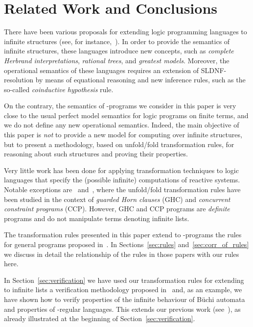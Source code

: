 \documentclass[english]{tlp}
\begin{document}
\section{Related Work and Conclusions}
\label{sec:related}

There have been various proposals for extending logic programming languages to
infinite structures (see, for instance,~\cite{Col82,Llo87,MiG09,Si&06}). 
In order to provide the semantics of infinite
structures, these
languages introduce new concepts, 
such as {\em complete Herbrand interpretations}, {\em rational
trees}, and {\em greatest models}. Moreover, the operational semantics of these
languages requires an extension of SLDNF-resolution by means of equational reasoning 
 and new inference rules, such as the so-called {\em coinductive hypothesis} rule.

On the contrary, the semantics of -programs we consider in this paper is very
close to the usual perfect model semantics for logic programs
on finite terms, and we do not define any new operational semantics.
Indeed, the main objective of this paper is {\em not} to provide a
new model for computing over infinite structures, but to present a
methodology, based on unfold/fold transformation rules, for reasoning about
such structures and proving their properties.

Very little work has been done for applying transformation techniques to
logic languages that specify the (possible infinite) 
computations of reactive systems.  Notable
exceptions are~\cite{UeF88} and~\cite{Et&01}, where the unfold/fold
transformation rules have been studied in the context of {\em
guarded Horn clauses} (GHC) and {\em concurrent constraint programs}
(CCP). However, GHC and CCP programs are {\em definite} programs and
do not manipulate terms denoting infinite lists. 

The transformation rules presented in this paper extend to 
-programs the
rules for general programs proposed 
in~\cite{Fi&04a,PeP00a,Ro&02,Sek91,Sek09}. In 
Sections~\ref{sec:rules} and~\ref{sec:corr_of_rules}
we discuss in detail 
the relationship of the rules in those papers with our rules here.

In Section~\ref{sec:verification} we have used our transformation 
rules for extending to infinite lists a verification
methodology proposed in~\cite{PeP00a} 
and, as an example, we have shown how to verify
properties of the infinite behaviour of B\"uchi automata and 
properties of -regular languages.
This extends our previous work (see~\cite{Pe&09b}), as already
illustrated at the beginning of Section~\ref{sec:verification}.
\end{document}
